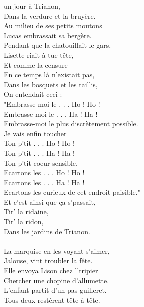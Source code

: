 
 un jour à Trianon,
\\Dans la verdure et la bruyère.
\\Au milieu de ses petits moutons
\\Lucas embrassait sa bergère.
\\Pendant que la chatouillait le gars,
\\Lisette riait à tue-tête,
\\Et comme la censure
\\En ce temps là n’existait pas,
\\Dans les bosquets et les taillis,
\\On entendait ceci :
\\"Embrasse-moi le . . . Ho ! Ho !
\\Embrasse-moi le . . . Ha ! Ha !
\\Embrasse-moi le plus discrètement possible.
\\Je vais enfin toucher
\\Ton p’tit . . . Ho ! Ho !
\\Ton p’tit . . . Ha ! Ha !
\\Ton p’tit coeur sensible.
\\Ecartons les . . . Ho ! Ho !
\\Ecartons les . . . Ha ! Ha !
\\Ecartons les curieux de cet endroit paisible."
\\Et c’est ainsi que ça s’passait,
\\Tir’ la ridaine,
\\Tir’ la ridon,
\\Dans les jardins de Trianon.
\\\\La marquise en les voyant s’aimer,
\\Jalouse, vint troubler la fête.
\\Elle envoya Lison chez l’tripier
\\Chercher une chopine d’allumette.
\\L’enfant partit d’un pas guilleret.
\\Tous deux restèrent tête à tête.
